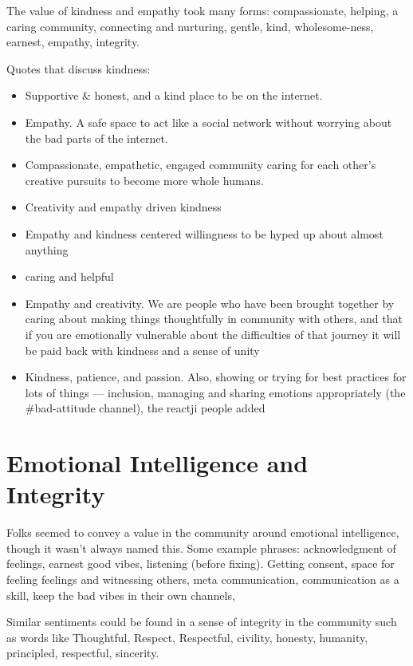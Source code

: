 \documentclass[
]{book}
\providecommand{\tightlist}{%
  \setlength{\itemsep}{0pt}\setlength{\parskip}{0pt}}
\begin{document}
The value of kindness and empathy took many forms: compassionate, helping, a caring community, connecting and nurturing, gentle, kind, wholesome-ness, earnest, empathy, integrity.

Quotes that discuss kindness:

\begin{itemize}
\tightlist
\item
  Supportive \& honest, and a kind place to be on the internet.
\item
  Empathy. A safe space to act like a social network without worrying about the bad parts of the internet.
\item
  Compassionate, empathetic, engaged community caring for each other's creative pursuits to become more whole humans.
\item
  Creativity and empathy driven kindness
\item
  Empathy and kindness centered willingness to be hyped up about almost anything
\item
  caring and helpful
\item
  Empathy and creativity. We are people who have been brought together by caring about making things thoughtfully in community with others, and that if you are emotionally vulnerable about the difficulties of that journey it will be paid back with kindness and a sense of unity
\item
  Kindness, patience, and passion. Also, showing or trying for best practices for lots of things --- inclusion, managing and sharing emotions appropriately (the \#bad-attitude channel), the reactji people added
\end{itemize}

\section{Emotional Intelligence and Integrity}\label{emotional-intelligence-and-integrity}

Folks seemed to convey a value in the community around emotional intelligence, though it wasn't always named this. Some example phrases: acknowledgment of feelings, earnest good vibes, listening (before fixing). Getting consent, space for feeling feelings and witnessing others, meta communication, communication as a skill, keep the bad vibes in their own channels,

Similar sentiments could be found in a sense of integrity in the community such as words like Thoughtful, Respect, Respectful, civility, honesty, humanity, principled, respectful, sincerity.
\end{document}

